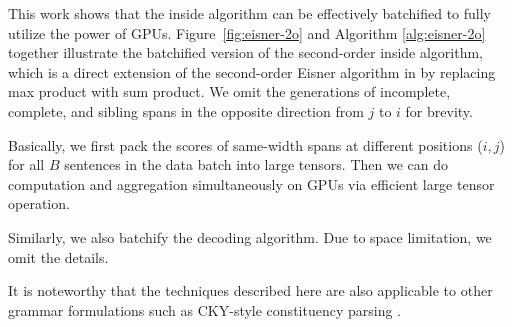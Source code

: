 This work shows that the inside algorithm
can be effectively batchified to fully utilize the power of GPUs.
Figure~\ref{fig:eisner-2o} and Algorithm \ref{alg:eisner-2o} together illustrate the batchified version of the second-order inside algorithm, which is a direct extension of the second-order Eisner algorithm in \citet{mcdonald-pereira-2006-online} by replacing max product with sum product.
We omit the generations of incomplete, complete, and sibling spans in the opposite direction from $j$ to $i$ for brevity.



Basically, we first pack the scores of same-width spans at different positions
($i, j$) for all $B$ sentences in the data batch into large tensors.
Then we can do computation and aggregation simultaneously on GPUs via efficient large tensor operation.

Similarly, we also batchify the decoding algorithm. Due to space limitation, we omit the details.

It is noteworthy that the techniques described here are also applicable to other grammar formulations such as CKY-style constituency parsing \cite{finkel-etal-2008-efficient,drozdov-etal-2019-unsupervised-latent}.



